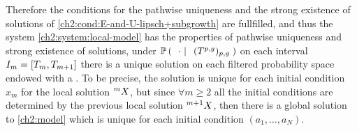 Therefore the conditions for the pathwise uniqueness and the strong existence of solutions of \ref{ch2:cond:E-and-U-lipsch+subgrowth} are fullfilled, and thus the system \ref{ch2:system:local-model} has the properties of pathwise uniqueness and strong existence of solutions, \ie under $\mathbb{P} \left( \; \left. \; \cdot \; \right| \; \;(T^{p,g})_{p,g}  \; \right)$ on each interval $I_m = [T_m, T_{m+1}]$ there is a unique solution on each filtered probability space endowed with a \Bm .
To be precise, the solution is unique for each initial condition $x_m$ for the local solution ${}^m X$, but since $\forall m \geq 2$ all the initial conditions are determined by the previous local solution ${}^{m+1}X$, then there is a global solution to \ref{ch2:model} which is unique for each initial condition $(a_1, \ldots, a_N)$.